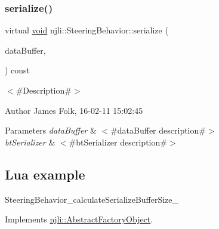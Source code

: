 \subsubsection{\texorpdfstring{serialize()}{serialize()}}
{\footnotesize\ttfamily virtual \mbox{\hyperlink{_thread_8h_af1e856da2e658414cb2456cb6f7ebc66}{void}} njli\+::\+Steering\+Behavior\+::serialize (\begin{DoxyParamCaption}\item[{\mbox{\hyperlink{_thread_8h_af1e856da2e658414cb2456cb6f7ebc66}{void}} $\ast$}]{data\+Buffer,  }\item[{bt\+Serializer $\ast$}]{ }\end{DoxyParamCaption}) const\hspace{0.3cm}{\ttfamily [virtual]}}



$<$\#\+Description\#$>$ 

\begin{DoxyAuthor}{Author}
James Folk, 16-\/02-\/11 15\+:02\+:45
\end{DoxyAuthor}

\begin{DoxyParams}{Parameters}
{\em data\+Buffer} & $<$\#data\+Buffer description\#$>$ \\
\hline
{\em bt\+Serializer} & $<$\#bt\+Serializer description\#$>$\\
\hline
\end{DoxyParams}
\hypertarget{classnjli_1_1_steering_behavior_wander_ex1}{}\subsection{Lua example}\label{classnjli_1_1_steering_behavior_wander_ex1}

\begin{DoxyCodeInclude}
\end{DoxyCodeInclude}
Steering\+Behavior\+\_\+calculate\+Serialize\+Buffer\+Size\+\_\+ 

Implements \mbox{\hyperlink{classnjli_1_1_abstract_factory_object_aad2fbe86fb3bdecf02918a96b9c57976}{njli\+::\+Abstract\+Factory\+Object}}.



